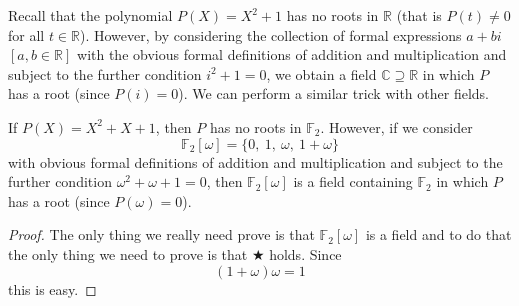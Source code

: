 Recall that the polynomial $P(X)=X^{2}+1$ has no roots
in ${\mathbb R}$ (that is $P(t)\neq 0$ for all $t\in{\mathbb R}$).
However, by considering the collection
of formal expressions $a+bi$ $[a,b\in{\mathbb R}]$
with the
obvious formal definitions of addition and multiplication
and subject to the further
condition $i^{2}+1=0$, we obtain a field
${\mathbb C}\supseteq{\mathbb R}$ in which $P$ has a root
(since $P(i)=0$).
We can perform a similar trick with other fields.
\begin{example} If $P(X)=X^{2}+X+1$, then $P$ has
no roots in ${\mathbb F}_{2}$. However, if we consider
\[{\mathbb F}_{2}[\omega]=
\{0,\ 1,\ \omega,\ 1+\omega\}\]
with
obvious formal definitions of addition and multiplication
and subject to the further
condition $\omega^{2}+\omega+1=0$, then
${\mathbb F}_{2}[\omega]$ is a field containing ${\mathbb F}_{2}$
in which $P$ has a root (since $P(\omega)=0$).
\end{example}
\begin{proof}  The only thing we really
need prove is that
${\mathbb F}_{2}[\omega]$ is a field and to
do that the only thing we need to prove is that
$\bigstar$ holds. Since
\[(1+\omega)\omega=1\]
this is easy.
\end{proof}

